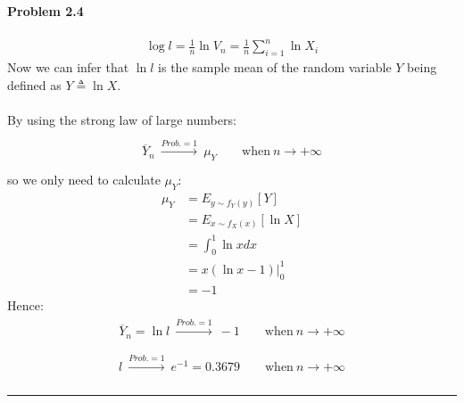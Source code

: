 \documentclass[12pt, letterpaper]{scrartcl}
\begin{document}
\paragraph*{Problem 2.4} \hfill\newline
\begin{align*}
    \log l=\frac{1}{n}\ln V_n=\frac{1}{n}\sum_{i=1}^{n}\ln X_i
\end{align*}
Now we can infer that $\ln l$ is the sample mean of the random variable $Y$ being defined as $Y\triangleq\ln X$.\\\\
By using the strong law of large numbers:
\begin{align*}
    \begin{matrix}{}\\{\overline {Y}}_{n}\ {\xrightarrow {Prob.=1}}\ \mu_Y \qquad {\textrm {when}}\ n\to +\infty\\{}\end{matrix}
\end{align*}
so we only need to calculate $\mu_Y$:
\begin{align*}
    \mu_Y&=E_{y\sim f_Y(y)}[Y]\\
    &=E_{x\sim f_X(x)}[\ln X]\\
    &=\int_0^1\ln xdx\\
    &=x(\ln x-1)\bigg\rvert_0^1\\
    &=-1
\end{align*}
Hence:
\begin{align*}
    \begin{matrix}{}{\overline {Y}}_{n}=\ln l\ {\xrightarrow {Prob.=1}}\ -1 \qquad {\textrm {when}}\ n\to +\infty{}\end{matrix}
\end{align*}
\begin{align*}
    \begin{matrix}{}\\{l}\ {\xrightarrow {Prob.=1}}\ e^{-1}=0.3679 \qquad {\textrm {when}}\ n\to +\infty\\{}\end{matrix}
\end{align*}
\hrule
\end{document}
